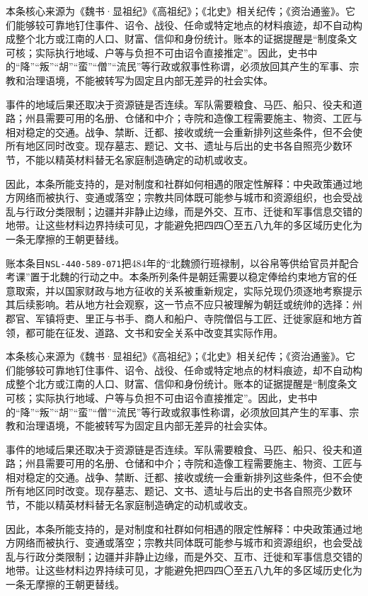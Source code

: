 本条核心来源为《魏书·显祖纪》《高祖纪》；《北史》相关纪传；《资治通鉴》。它们能够较可靠地钉住事件、诏令、战役、任命或特定地点的材料痕迹，却不自动构成整个北方或江南的人口、财富、信仰和身份统计。账本的证据提醒是“制度条文可核；实际执行地域、户等与负担不可由诏令直接推定”。因此，史书中的“降”“叛”“胡”“蛮”“僧”“流民”等行政或叙事性称谓，必须放回其产生的军事、宗教和治理语境，不能被转写为固定且内部无差异的社会实体。

事件的地域后果还取决于资源链是否连续。军队需要粮食、马匹、船只、役夫和道路；州县需要可用的名册、仓储和中介；寺院和造像工程需要施主、物资、工匠与相对稳定的交通。战争、禁断、迁都、接收或统一会重新排列这些条件，但不会使所有地区同时改变。现存墓志、题记、文书、遗址与后出的史书各自照亮少数环节，不能以精英材料替无名家庭制造确定的动机或收支。

因此，本条所能支持的，是对制度和社群如何相遇的限定性解释：中央政策通过地方网络而被执行、变通或落空；宗教共同体既可能参与城市和资源组织，也会受战乱与行政分类限制；边疆并非静止边缘，而是外交、互市、迁徙和军事信息交错的地带。让这些材料边界持续可见，才能避免把四四〇至五八九年的多区域历史化为一条无摩擦的王朝更替线。

账本条目\texttt{NSL-440-589-071}把484年的“北魏颁行班禄制，以谷帛等供给官员并配合考课”置于北魏的行动之中。本条所列条件是朝廷需要以稳定俸给约束地方官的任意取索，并以国家财政与地方征收的关系被重新规定，实际兑现仍须逐地考察提示其后续影响。若从地方社会观察，这一节点不应只被理解为朝廷或统帅的选择：州郡官、军镇将吏、里正与书手、商人和船户、寺院僧侣与工匠、迁徙家庭和地方首领，都可能在征发、道路、文书和安全关系中改变其实际作用。

本条核心来源为《魏书·显祖纪》《高祖纪》；《北史》相关纪传；《资治通鉴》。它们能够较可靠地钉住事件、诏令、战役、任命或特定地点的材料痕迹，却不自动构成整个北方或江南的人口、财富、信仰和身份统计。账本的证据提醒是“制度条文可核；实际执行地域、户等与负担不可由诏令直接推定”。因此，史书中的“降”“叛”“胡”“蛮”“僧”“流民”等行政或叙事性称谓，必须放回其产生的军事、宗教和治理语境，不能被转写为固定且内部无差异的社会实体。

事件的地域后果还取决于资源链是否连续。军队需要粮食、马匹、船只、役夫和道路；州县需要可用的名册、仓储和中介；寺院和造像工程需要施主、物资、工匠与相对稳定的交通。战争、禁断、迁都、接收或统一会重新排列这些条件，但不会使所有地区同时改变。现存墓志、题记、文书、遗址与后出的史书各自照亮少数环节，不能以精英材料替无名家庭制造确定的动机或收支。

因此，本条所能支持的，是对制度和社群如何相遇的限定性解释：中央政策通过地方网络而被执行、变通或落空；宗教共同体既可能参与城市和资源组织，也会受战乱与行政分类限制；边疆并非静止边缘，而是外交、互市、迁徙和军事信息交错的地带。让这些材料边界持续可见，才能避免把四四〇至五八九年的多区域历史化为一条无摩擦的王朝更替线。

